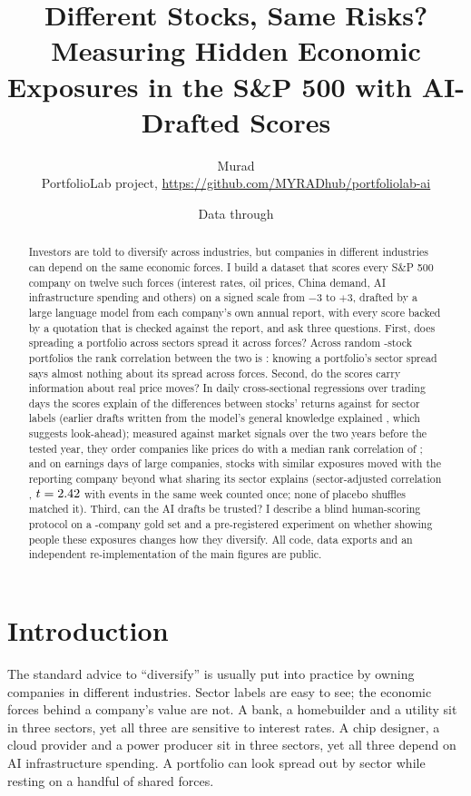 \documentclass[11pt]{article}
\title{Different Stocks, Same Risks?\\[4pt]
\large Measuring Hidden Economic Exposures in the S\&P 500 with AI-Drafted Scores}
\author{Murad\\\small PortfolioLab project, \url{https://github.com/MYRADhub/portfoliolab-ai}}
\date{Data through \dataThrough}
\begin{document}
\maketitle

\begin{abstract}
\noindent Investors are told to diversify across industries, but companies in different industries can depend on the same economic forces. I build a dataset that scores every S\&P 500 company on twelve such forces (interest rates, oil prices, China demand, AI infrastructure spending and others) on a signed scale from $-3$ to $+3$, drafted by a large language model from each company's own annual report, with every score backed by a quotation that is checked against the report, and ask three questions. First, does spreading a portfolio across sectors spread it across forces? Across \nRandom{} random \randomSize-stock portfolios the rank correlation between the two is \spearmanSectorsForces: knowing a portfolio's sector spread says almost nothing about its spread across forces. Second, do the scores carry information about real price moves? In daily cross-sectional regressions over \fitDays{} trading days the scores explain \fitExposures{} of the differences between stocks' returns against \fitSectors{} for sector labels (earlier drafts written from the model's general knowledge explained \memExposures, which suggests look-ahead); measured against market signals over the two years before the tested year, they order companies like prices do with a median rank correlation of \pcMedianRho; and on \spEvents{} earnings days of \spCompanies{} large companies, stocks with similar exposures moved with the reporting company beyond what sharing its sector explains (sector-adjusted correlation \spClusteredPartial, $t = 2.42$ with events in the same week counted once; none of \spShuffles{} placebo shuffles matched it). Third, can the AI drafts be trusted? I describe a blind human-scoring protocol on a \goldSize-company gold set and a pre-registered experiment on whether showing people these exposures changes how they diversify. All code, data exports and an independent re-implementation of the main figures are public.
\end{abstract}

\section{Introduction}

The standard advice to ``diversify'' is usually put into practice by owning companies in different industries. Sector labels are easy to see; the economic forces behind a company's value are not. A bank, a homebuilder and a utility sit in three sectors, yet all three are sensitive to interest rates. A chip designer, a cloud provider and a power producer sit in three sectors, yet all three depend on AI infrastructure spending. A portfolio can look spread out by sector while resting on a handful of shared forces.
\end{document}

